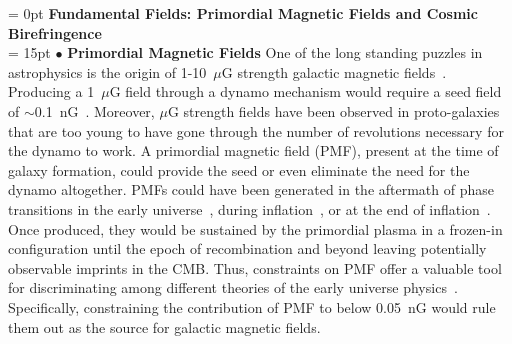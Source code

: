\documentclass[PICOReport.tex]{subfiles}
\begin{document}
\vspace{0.1in}
\parindent = 0pt
{\bf Fundamental Fields: Primordial Magnetic Fields and Cosmic Birefringence} \\ %
\parindent = 15pt
$\bullet$ {\bf Primordial Magnetic Fields} \hspace{0.1in} One of the long standing puzzles in astrophysics is the origin of 1-10~$\mu$G strength galactic magnetic fields~\cite{Widrow:2002ud}. Producing a 1~$\mu$G field through a dynamo mechanism would require a seed field of $\sim$0.1~nG~\cite{Widrow:2011hs}. Moreover, $\mu$G strength fields have been observed in proto-galaxies that are too young to have gone through the number of revolutions necessary for the dynamo to work. A primordial magnetic field (PMF), present at the time of galaxy formation, could provide the seed or even eliminate the need for the dynamo altogether. PMFs could have been generated in the aftermath of phase transitions in the early universe~\cite{Vachaspati:1991nm}, during inflation~\cite{Turner:1987bw,Ratra:1991bn}, or at the end of inflation~\cite{DiazGil:2007dy}. Once produced, they would be sustained by the primordial plasma in a frozen-in configuration until the epoch of recombination and beyond leaving potentially observable imprints in the CMB. Thus, constraints on PMF offer a valuable tool for discriminating among different theories of the early universe physics~\cite{Barnaby:2012tk,Long:2013tha,Durrer:2013pga}. Specifically, constraining the contribution of PMF to below 0.05~nG would rule them out as the source for galactic magnetic fields.  
\end{document}
